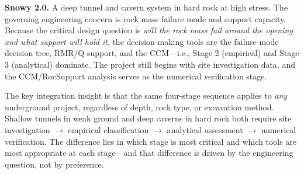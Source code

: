 \textbf{Snowy 2.0.} A deep tunnel and cavern system in hard rock at high stress. The governing engineering concern is rock mass failure mode and support capacity. Because the critical design question is \textit{will the rock mass fail around the opening and what support will hold it}, the decision-making tools are the failure-mode decision tree, RMR/Q support, and the CCM---i.e., Stage 2 (empirical) and Stage 3 (analytical) dominate. The project still begins with site investigation data, and the CCM/RocSupport analysis serves as the numerical verification stage.

\begin{notebox}
The key integration insight is that the same four-stage sequence applies to \textit{any} underground project, regardless of depth, rock type, or excavation method. Shallow tunnels in weak ground and deep caverns in hard rock both require site investigation $\to$ empirical classification $\to$ analytical assessment $\to$ numerical verification. The difference lies in which stage is most critical and which tools are most appropriate at each stage---and that difference is driven by the engineering question, not by preference.
\end{notebox}
